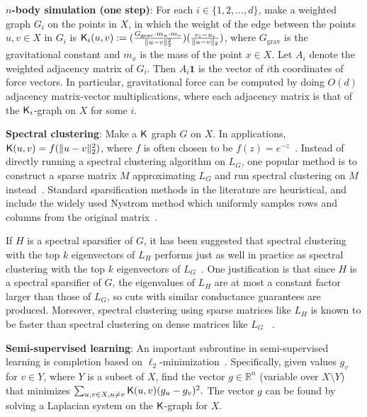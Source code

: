 \vspace{1mm} \begin{tight_enumerate} \item \textbf{$n$-body simulation (one
    step)}: For each $i\in \{1,2,\hdots,d\}$, make a weighted graph
$G_i$ on the points in $X$, in which the weight of the edge between the
points $u,v\in X$ in $G_i$ is $\mathsf{K}_i(u,v) := (\frac{G_{\text{grav}} \cdot
    m_u \cdot m_v}{\|u - v\|_2^2})(\frac{v_i - u_i}{\|u - v\|_2})$,
       where $G_{\text{grav}}$ is the gravitational constant and $m_x$
       is the mass of the point $x\in X$. Let $A_i$ denote the weighted
       adjacency matrix of $G_i$. Then $A_i\textbf{1}$ is the vector of
       $i$th coordinates of force vectors. In particular, gravitational
       force can be computed by doing $O(d)$ adjacency matrix-vector
       multiplications, where each adjacency matrix is that of the
       $\mathsf{K}_i$-graph on $X$ for some $i$.

\item \textbf{Spectral clustering}: Make a $\mathsf{K}$ graph $G$ on $X$. In
applications, $\mathsf{K}(u,v) = f(\|u-v\|_2^2)$, where $f$ is often chosen to
be $f(z) = e^{-z}$~\cite{l07,njw02}. Instead of directly running a
spectral clustering algorithm on $L_G$, one popular method is to
construct a sparse matrix $M$ approximating $L_G$ and run spectral
clustering on $M$ instead~\cite{chl16,csblc11, kmt12}. Standard
sparsification methods in the literature are heuristical, and include
the widely used Nystrom method which uniformly samples rows and columns
from the original matrix~\cite{cjkmm13}. 

If $H$ is a spectral sparsifier of $G$, it has been suggested that
spectral clustering with the top $k$ eigenvectors of $L_H$ performs just
as well in practice as spectral clustering with the top $k$ eigenvectors
of $L_G$~\cite{chl16}.  One justification is that since $H$ is a
spectral sparsifier of $G$, the eigenvalues of $L_H$ are at most a
constant factor larger than those of $L_G$, so cuts with similar
conductance guarantees are produced. Moreover, spectral clustering using
sparse matrices like $L_H$ is known to be faster than spectral
clustering on dense matrices like $L_G$ ~\cite{chl16, cjkmm13, kmt12}.

\item \textbf{Semi-supervised learning}: An important subroutine in
semi-supervised learning is completion based on
$\ell_2$-minimization~\cite{z05, z05survey, lszlh19}. Specifically,
  given values $g_v$ for $v\in Y$, where $Y$ is a subset of $X$, find
  the vector $g\in \mathbb{R}^n$ (variable over $X\setminus Y$) that
  minimizes $\sum_{u,v\in X,u\ne v} \mathsf{K}(u,v) (g_u - g_v)^2.$ The vector
  $g$ can be found by solving a Laplacian system on the $\mathsf{K}$-graph for
  $X$.  \end{tight_enumerate} \vspace{1mm}

